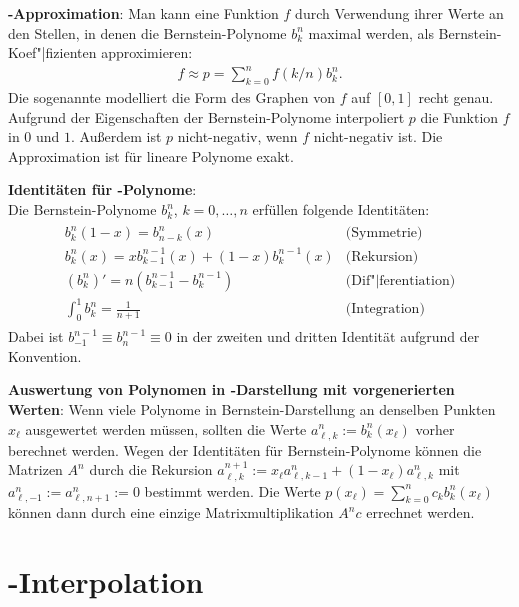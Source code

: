 \linie

\textbf{-Approximation}:
Man kann eine Funktion $f$ durch Verwendung ihrer Werte an den Stellen, in denen die
Bernstein-Polynome $b_k^n$ maximal werden, als Bernstein-Koef"|fizienten approximieren:
\begin{align*}
    f \approx p = \sum_{k=0}^n f(k/n) b_k^n.
\end{align*}
Die sogenannte  modelliert
die Form des Graphen von $f$ auf $[0, 1]$ recht genau.
Aufgrund der Eigenschaften der Bernstein-Polynome interpoliert $p$ die Funktion $f$ in $0$ und $1$.
Außerdem ist $p$ nicht-negativ, wenn $f$ nicht-negativ ist.
Die Approximation ist für lineare Polynome exakt.

\linie
\pagebreak

\textbf{Identitäten für -Polynome}:\\
Die Bernstein-Polynome $b_k^n$, $k = 0, \dots, n$ erfüllen folgende Identitäten:
\begin{align*}
    \begin{array}{cl}
        b_k^n(1 - x) = b_{n-k}^n(x) & \text{(Symmetrie)}\\[2mm]
        b_k^n(x) = x b_{k-1}^{n-1}(x) + (1 - x) b_k^{n-1}(x) & \text{(Rekursion)}\\[2mm]
        (b_k^n)' = n (b_{k-1}^{n-1} - b_k^{n-1}) & \text{(Dif"|ferentiation)}\\[2mm]
        \int_0^1 b_k^n = \frac{1}{n+1} & \text{(Integration)}
    \end{array}
\end{align*}
Dabei ist $b_{-1}^{n-1} \equiv b_n^{n-1} \equiv 0$ in der zweiten und dritten Identität
aufgrund der Konvention.

\linie

\textbf{Auswertung von Polynomen in -Darstellung mit vorgenerierten Werten}:
Wenn viele Polynome in Bernstein-Darstellung an denselben Punkten $x_\ell$ ausgewertet
werden müssen, sollten die Werte $a_{\ell,k}^n := b_k^n(x_\ell)$ vorher berechnet werden.
Wegen der Identitäten für Bernstein-Polynome können die Matrizen $A^n$ durch die Rekursion
$a_{\ell,k}^{n+1} := x_\ell a_{\ell,k-1}^n + (1 - x_\ell) a_{\ell,k}^n$
mit $a_{\ell,-1}^n := a_{\ell,n+1}^n := 0$ bestimmt werden.
Die Werte $p(x_\ell) = \sum_{k=0}^n c_k b_k^n(x_\ell)$ können dann durch eine einzige
Matrixmultiplikation $A^n c$ errechnet werden.

\section{%
    -Interpolation%
}

